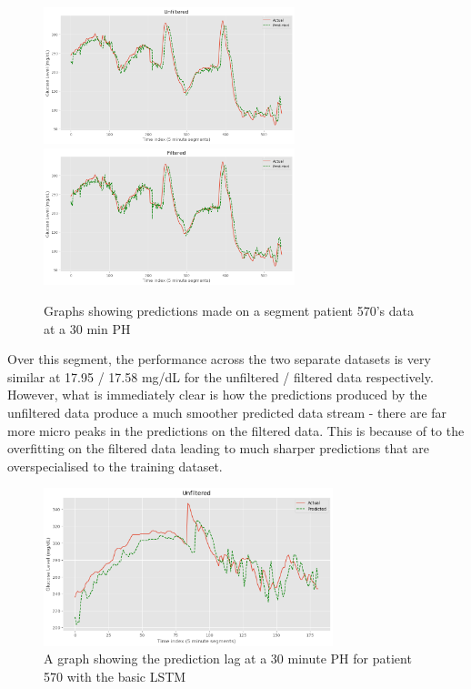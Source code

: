       \begin{figure}[H]
        \centering

        \includegraphics[width=0.65\textwidth]{images/Basic305.png}
        \includegraphics[width=0.65\textwidth]{images/Filt305.png}  
        \caption{
         Graphs showing predictions made on a segment patient 570's data at a 30 min PH
        }
      \end{figure}

      Over this segment, the performance across the two separate datasets is very similar at 17.95 / 17.58 mg/dL for the unfiltered / filtered data respectively. However, what is immediately clear is how the predictions produced by the unfiltered data produce a much smoother predicted data stream - there are far more micro peaks in the predictions on the filtered data. This is because of to the overfitting on the filtered data leading to much sharper predictions that are overspecialised to the training dataset.

      \begin{figure}[H]
        \centering

        \includegraphics[width=0.75\textwidth]{images/ZoomedinBasic.png}
        \caption{
         A graph showing the prediction lag at a 30 minute PH for patient 570 with the basic LSTM
        }
      \end{figure}


